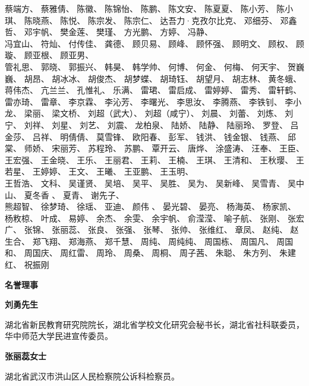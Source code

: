 \begin{center}
蔡端方、
蔡雅倩、
陈徽、
陈锦怡、
陈鹏、
陈文安、
陈夏夏、
陈小芳、
陈小琪、
陈晓燕、
陈悦、
陈宗发、
陈宗仁、
达吾力·克孜尔比克、
邓细芬、
邓鑫哲、
邓宇帆、
樊金莲、
樊瑾、
方光鹏、
方婷、
冯静、\\
冯宜山、
符灿、
付传佳、
龚德、
顾贝易、
顾峰、
顾怀强、
顾明文、
顾权、
顾璇、
顾亚根、
顾亚男、\\
管礼思、
郭晓、
郭振兴、
韩昊、
韩学帅、
何博、
何金、
何梅、
何天宇、
贺巍巍、
胡昂、
胡冰冰、
胡俊杰、
胡梦蝶、
胡琦钰、
胡望月、
胡志林、
黄冬蛾、
蒋伟杰、
亢兰兰、
孔惟礼、
乐满、
雷珺、
雷启成、
雷婷婷、
雷秀、
雷轩鹤、
雷亦琦、
雷章、
李京霖、
李沁芳、
李曙光、
李思汝、
李腾燕、
李铁钊、
李小龙、
梁丽、
梁文桥、
刘超（武大）、
刘超（咸宁）、
刘晨、
刘蕾、
刘炼、
刘宁、
刘祥、
刘星、
刘艺、
刘震、
龙柏泉、
陆娇、
陆静、
陆丽玲、
罗登、
吕金莎、
吕祥、
明倩倩、
莫雪锋、
欧阳春、
彭军、
钱洪、
钱金银、
钱燕、
邱棠、
师娇、
宋丽芳、
苏程玲、
苏鹏、
覃开云、
唐烨、
涂盛涛、
汪奉、
王臣、
王宏强、
王金晓、
王乐、
王丽君、
王莉、
王楠、
王琪、
王清和、
王秋璎、
王若星、
王婷婷、
王文、
王曦、
王亚鹏、
王玉明、\\
王哲浩、
文科、
吴谨贤、
吴培、
吴平、
吴胜、
吴为、
吴新峰、
吴雪青、
吴中山、
夏冬香 、
夏青、
谢先子、\\
熊超智、
徐梦琦、
徐瑶、
亚迪、
颜伟 、
晏光碧、
晏亮、
杨海英、
杨家凯、
杨敉椋、
叶成、
易婷、
余杰、
余雯、
余宇帆、
俞滢滢、
喻子航、
张刚、
张宏广、
张锦、
张丽蕊、
张良、
张强、
张琴、
张帅、
张维红、
章凤、
赵纯、
赵生合、
郑飞翔、
郑海燕、
郑千慧、
周纯、
周纯纯、
周国栋、
周国凡、
周国和、
周国庆、
周红雷、
周玲、
周桑、
周桐、
周子茜、
朱聪、
朱方列、
朱建红、
祝振刚

\end{center}




\clearpage
\vspace{10pt}

\vspace{20pt}

\centerline{\textbf{名誉理事}}

\vspace{10pt}

\textbf{刘勇先生 }

湖北省新民教育研究院院长，湖北省学校文化研究会秘书长，湖北省社科联委员，华中师范大学民进宣传委员。

\textbf{张丽蕊女士} 

湖北省武汉市洪山区人民检察院公诉科检察员。

